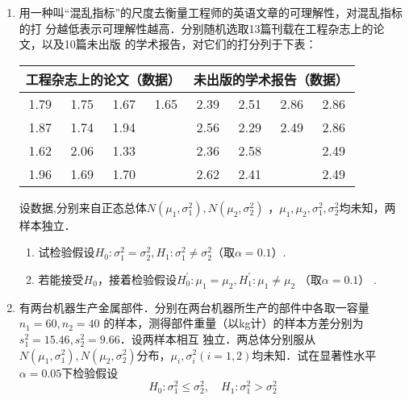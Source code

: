 \documentclass[10pt,a4paper]{article}
\begin{document}
\begin{enumerate}
    \item 用一种叫“混乱指标”的尺度去衡量工程师的英语文章的可理解性，对混乱指标的打
    分越低表示可理解性越高．分别随机选取13篇刊载在工程杂志上的论文，以及10篇未出版
    的学术报告，对它们的打分列于下表：
    \renewcommand{\arraystretch}{1.3} 
    \begin{table}[H]\centering
    \begin{tabular}{cccc|cccc}
        \hline
        \multicolumn{4}{c|}{工程杂志上的论文（数据\uppercase\expandafter{\romannumeral1}）} & \multicolumn{4}{c}{未出版的学术报告（数据\uppercase\expandafter{\romannumeral2}）}         \\ \hline
        1.79   & 1.75   & 1.67   & 1.65   & 2.39      & 2.51      & 2.86     & {\color[HTML]{FFFFFF} 2.86} \\
        1.87   & 1.74   & 1.94   &        & 2.56      & 2.29      & 2.49     & {\color[HTML]{FFFFFF} 2.86} \\
        1.62   & 2.06   & 1.33   &        & 2.36      & 2.58      &          & {\color[HTML]{FFFFFF} 2.49} \\
        1.96   & 1.69   & 1.70   &        & 2.62      & 2.41      &          & {\color[HTML]{FFFFFF} 2.49} \\ \hline
    \end{tabular}
    \end{table}
    \renewcommand{\arraystretch}{1.0} 
    设数据\uppercase\expandafter{},\uppercase\expandafter{}分别来自正态总体$N(\mu_1,\sigma_1^2),N(\mu_2,\sigma_2^2)$
    ，$\mu_1,\mu_2,\sigma_1^2,\sigma_2^2$均未知，两样本独立．
    \begin{enumerate}
        \item 试检验假设$H_0:\sigma_1^2=\sigma_2^2,H_1:\sigma_1^2\neq \sigma_2^2$（取$\alpha=0.1$）.
        \item 若能接受$H_0$，接着检验假设$H^\prime_0:\mu_1=\mu_2,H^\prime_1:\mu_1\neq \mu_2$ （取$\alpha=0.1$） .
    \end{enumerate}




    \item 有两台机器生产金属部件．分别在两台机器所生产的部件中各取一容量$n_1=60,n_2=40$
    的样本，测得部件重量（以kg计）的样本方差分别为$s_1^2=15.46,s_2^2=9.66$．设两样本相互
    独立．两总体分别服从$N(\mu_1,\sigma_1^2),N(\mu_2,\sigma_2^2)$分布，$\mu_i,\sigma_i^2(i=1,2)$均未知．试在显著性水平
    $\alpha=0.05$下检验假设
    $$H_0:\sigma_1^2\leq \sigma_2^2,\quad H_1:\sigma_1^2>\sigma_2^2$$





\end{enumerate}
\end{document}
